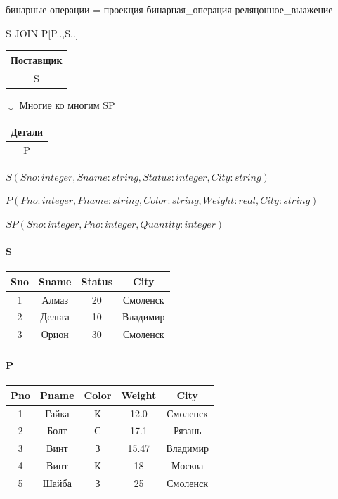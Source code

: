 \documentclass[a4paper, 14pt]{report}
\begin{document}
бинарные операции = проекция бинарная\_операция реляцонное\_выажение

S JOIN P[P..,S..]

\begin{tabular}{|c|}
    \hline
    Поставщик \\
    \hline
    S \\
    \hline
\end{tabular}

$ \downarrow $ Многие ко многим SP

\begin{tabular}{|c|}
    \hline
    Детали \\
    \hline
    P \\
    \hline
\end{tabular}

\hfill

$S(Sno : integer, Sname : string, Status : integer, City : string)$

$P(Pno : integer, Pname : string, Color : string, Weight : real, City : string)$

$SP(Sno : integer, Pno : integer, Quantity : integer)$

\paragraph{S}

\hfill

\begin{tabular}{|c|c|c|c|}
    \hline
    Sno & Sname & Status & City \\
    \hline
    1 & Алмаз & 20 & Смоленск \\
    2 & Дельта & 10 & Владимир \\
    3 & Орион & 30 & Смоленск \\
    \hline
\end{tabular}

\paragraph{P}

\hfill

\begin{tabular}{|c|c|c|c|c|}
    \hline
    Pno & Pname & Color & Weight & City \\
    \hline
    1 & Гайка & К & 12.0 & Смоленск \\
    2 & Болт & С & 17.1 & Рязань \\
    3 & Винт & З & 15.47 & Владимир \\
    4 & Винт & К & 18 & Москва \\
    5 & Шайба & З & 25 & Смоленск \\
    \hline
\end{tabular}
\end{document}
